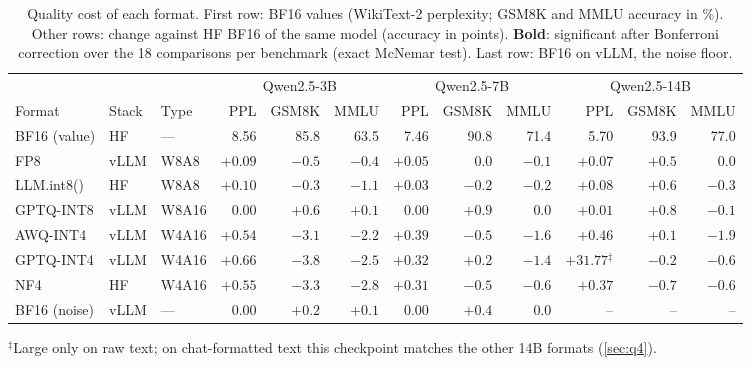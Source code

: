 \begin{table}[t]
\centering
\footnotesize
\caption{Quality cost of each format. First row: BF16 values (WikiText-2 perplexity; GSM8K and MMLU accuracy in \%). Other rows: change against HF BF16 of the same model (accuracy in points). \textbf{Bold}: significant after Bonferroni correction over the 18 comparisons per benchmark (exact McNemar test). Last row: BF16 on vLLM, the noise floor.}
\label{tab:quality_main}
\setlength{\tabcolsep}{2.9pt}
\begin{tabular}{lllrrrrrrrrr}
\toprule
 & & & \multicolumn{3}{c}{Qwen2.5-3B} & \multicolumn{3}{c}{Qwen2.5-7B} & \multicolumn{3}{c}{Qwen2.5-14B} \\
\cmidrule(lr){4-6}\cmidrule(lr){7-9}\cmidrule(lr){10-12}
Format & Stack & Type & PPL & GSM8K & MMLU & PPL & GSM8K & MMLU & PPL & GSM8K & MMLU \\
\midrule
BF16 (value) & HF & --- & 8.56 & 85.8 & 63.5 & 7.46 & 90.8 & 71.4 & 5.70 & 93.9 & 77.0 \\
\midrule
FP8 & vLLM & W8A8 & $+0.09$ & $-0.5$ & $-0.4$ & $+0.05$ & $0.0$ & $-0.1$ & $+0.07$ & $+0.5$ & $0.0$ \\
LLM.int8() & HF & W8A8 & $+0.10$ & $-0.3$ & $\mathbf{-1.1}$ & $+0.03$ & $-0.2$ & $-0.2$ & $+0.08$ & $+0.6$ & $-0.3$ \\
\midrule
GPTQ-INT8 & vLLM & W8A16 & $0.00$ & $+0.6$ & $+0.1$ & $0.00$ & $+0.9$ & $0.0$ & $+0.01$ & $+0.8$ & $-0.1$ \\
\midrule
AWQ-INT4 & vLLM & W4A16 & $+0.54$ & $\mathbf{-3.1}$ & $\mathbf{-2.2}$ & $+0.39$ & $-0.5$ & $\mathbf{-1.6}$ & $+0.46$ & $+0.1$ & $\mathbf{-1.9}$ \\
GPTQ-INT4 & vLLM & W4A16 & $+0.66$ & $\mathbf{-3.8}$ & $\mathbf{-2.5}$ & $+0.32$ & $+0.2$ & $\mathbf{-1.4}$ & $+31.77$$^{\ddagger}$ & $-0.2$ & $-0.6$ \\
NF4 & HF & W4A16 & $+0.55$ & $\mathbf{-3.3}$ & $\mathbf{-2.8}$ & $+0.31$ & $-0.5$ & $\mathbf{-0.6}$ & $+0.37$ & $-0.7$ & $-0.6$ \\
\midrule
BF16 (noise) & vLLM & --- & $0.00$ & $+0.2$ & $+0.1$ & $0.00$ & $+0.4$ & $0.0$ & -- & -- & -- \\
\bottomrule
\end{tabular}
\par\vspace{3pt}\parbox{\linewidth}{\scriptsize $^{\ddagger}$Large only on raw text; on chat-formatted text this checkpoint matches the other 14B formats (\cref{sec:q4}).}
\end{table}
